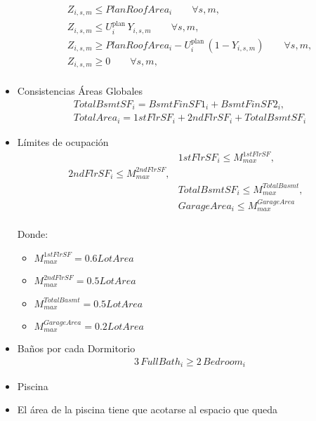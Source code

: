 \begin{itemize}
\begin{align}
& Z_{i,s,m} \le PlanRoofArea_i \qquad \forall s,m, \\[2pt]
& Z_{i,s,m} \le U^{\text{plan}}_i \, Y_{i,s,m} \qquad \forall s,m, \\[2pt]
& Z_{i,s,m} \ge PlanRoofArea_i - U^{\text{plan}}_i \,(1 - Y_{i,s,m}) \qquad \forall s,m, \\[2pt]
& Z_{i,s,m} \ge 0 \qquad \forall s,m, \\[6pt]
\end{align}

\cite{Dawid2023}


\item{Consistencias Áreas Globales}
\begin{align}

& TotalBsmtSF_i = BsmtFinSF1_i + BsmtFinSF2_i,\\
& TotalArea_i = 1stFlrSF_i + 2ndFlrSF_i + TotalBsmtSF_i
\end{align}

\item {Límites de ocupación}
\begin{align}
& 1stFlrSF_i \le M_{max}^{1stFlrSF},\quad \\2ndFlrSF_i \le M_{max}^{2ndFlrSF},\\
& TotalBsmtSF_i \le M_{max}^{TotalBasmt},\\ \quad 
& GarageArea_i \le M_{max}^{GarageArea}
\end{align}
\\
Donde:
    \begin{itemize}
        \item $M_{max}^{1stFlrSF}= 0.6LotArea$
        \item $M_{max}^{2ndFlrSF}=0.5 LotArea$
        \item $M_{max}^{TotalBasmt}= 0.5LotArea$
        \item $M_{max}^{GarageArea}= 0.2LotArea$
    \end{itemize}
    \item{Baños por cada Dormitorio}
\begin{align}
& 3\,FullBath_i \ge 2\,Bedroom_i
\end{align}

    \item {Piscina}\\
    \item {El área de la piscina tiene que acotarse al espacio que queda}


\end{itemize}
